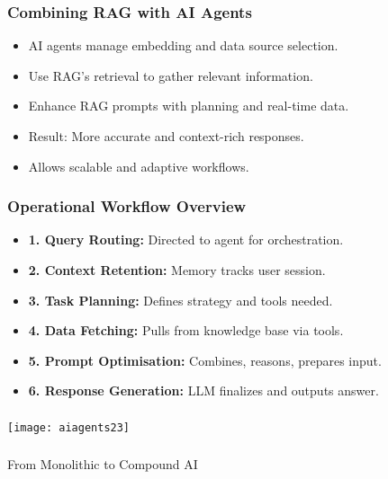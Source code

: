 \begin{frame}[fragile]\frametitle{Combining RAG with AI Agents}
    \begin{itemize}
        \item AI agents manage embedding and data source selection.
        \item Use RAG’s retrieval to gather relevant information.
        \item Enhance RAG prompts with planning and real-time data.
        \item Result: More accurate and context-rich responses.
        \item Allows scalable and adaptive workflows.
    \end{itemize}
\end{frame}

\begin{frame}[fragile]\frametitle{Operational Workflow Overview}
    \begin{itemize}
        \item \textbf{1. Query Routing:} Directed to agent for orchestration.
        \item \textbf{2. Context Retention:} Memory tracks user session.
        \item \textbf{3. Task Planning:} Defines strategy and tools needed.
        \item \textbf{4. Data Fetching:} Pulls from knowledge base via tools.
        \item \textbf{5. Prompt Optimisation:} Combines, reasons, prepares input.
        \item \textbf{6. Response Generation:} LLM finalizes and outputs answer.
    \end{itemize}
\end{frame}

\begin{frame}[fragile]\frametitle{}

\begin{center}
\texttt{[image: aiagents23]}
\end{center}	  
\end{frame}


\begin{frame}[fragile]\frametitle{}
\begin{center}
{\Large From Monolithic to Compound AI}
\end{center}
\end{frame}

